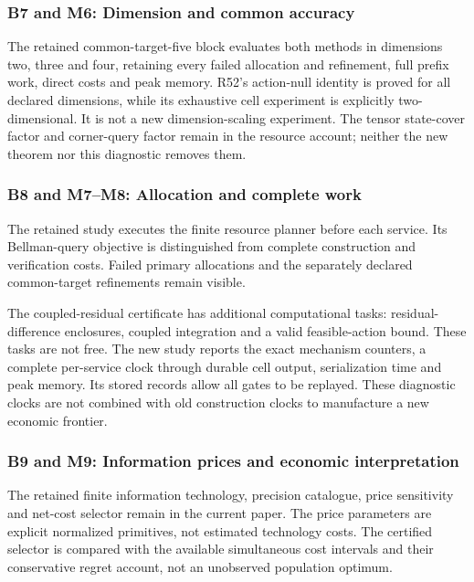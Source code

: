 \documentclass[ecta,nameyear,draft]{econsocart}
\begin{document}
\hypertarget{b7-and-m6-dimension-and-common-accuracy}{%
\subsubsection{B7 and M6: Dimension and common
accuracy}\label{b7-and-m6-dimension-and-common-accuracy}}

The retained common-target-five block evaluates both methods in
dimensions two, three and four, retaining every failed allocation and
refinement, full prefix work, direct costs and peak memory. R52's
action-null identity is proved for all declared dimensions, while its
exhaustive cell experiment is explicitly two-dimensional. It is not a
new dimension-scaling experiment. The tensor state-cover factor and
corner-query factor remain in the resource account; neither the new
theorem nor this diagnostic removes them.

\hypertarget{b8-and-m7m8-allocation-and-complete-work}{%
\subsubsection{B8 and M7--M8: Allocation and complete
work}\label{b8-and-m7m8-allocation-and-complete-work}}

The retained study executes the finite resource planner before each
service. Its Bellman-query objective is distinguished from complete
construction and verification costs. Failed primary allocations and the
separately declared common-target refinements remain visible.

The coupled-residual certificate has additional computational tasks:
residual-difference enclosures, coupled integration and a valid
feasible-action bound. These tasks are not free. The new study reports
the exact mechanism counters, a complete per-service clock through
durable cell output, serialization time and peak memory. Its stored
records allow all gates to be replayed. These diagnostic clocks are not
combined with old construction clocks to manufacture a new economic
frontier.

\hypertarget{b9-and-m9-information-prices-and-economic-interpretation}{%
\subsubsection{B9 and M9: Information prices and economic
interpretation}\label{b9-and-m9-information-prices-and-economic-interpretation}}

The retained finite information technology, precision catalogue, price
sensitivity and net-cost selector remain in the current paper. The price
parameters are explicit normalized primitives, not estimated technology
costs. The certified selector is compared with the available
simultaneous cost intervals and their conservative regret account, not
an unobserved population optimum.
\end{document}
